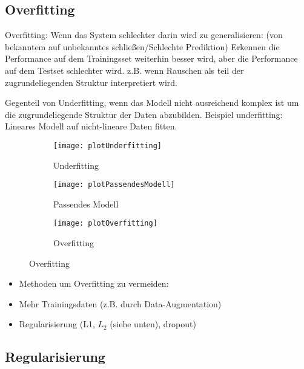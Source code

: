 \subsection{Overfitting}

Overfitting:
	Wenn das System schlechter darin wird zu generalisieren: (von bekanntem auf unbekanntes schließen/Schlechte Prediktion)
	Erkennen die Performance auf dem Trainingsset weiterhin besser wird, aber die Performance auf dem Testset schlechter wird.
	z.B. wenn Rauschen als teil der zugrundeliegenden Struktur interpretiert wird.

Gegenteil von Underfitting, wenn das Modell nicht ausreichend komplex ist um die zugrundeliegende Struktur der Daten abzubilden. 
Beispiel underfitting: Lineares Modell auf nicht-lineare Daten fitten.


\begin{figure}[h]
    \centering
    \begin{subfigure}[t]{0.4\textwidth}
		\texttt{[image: plotUnderfitting]}
		\caption{Underfitting}
    \end{subfigure}
    \begin{subfigure}[t]{0.4\textwidth}
		\texttt{[image: plotPassendesModell]}
		\caption{Passendes Modell}
	\end{subfigure}
	\quad
    \begin{subfigure}[t]{0.8\textwidth}
        \texttt{[image: plotOverfitting]}
        \caption{Overfitting}
    \end{subfigure}
    \label{fig:overfitting}
\end{figure}

\begin{itemize}
	\item Methoden um Overfitting zu vermeiden:
	\item Mehr Trainingsdaten (z.B. durch Data-Augmentation)
	\item Regularisierung (L1, \(L_2\) (siehe unten), dropout)
\end{itemize}


\subsection{Regularisierung}

